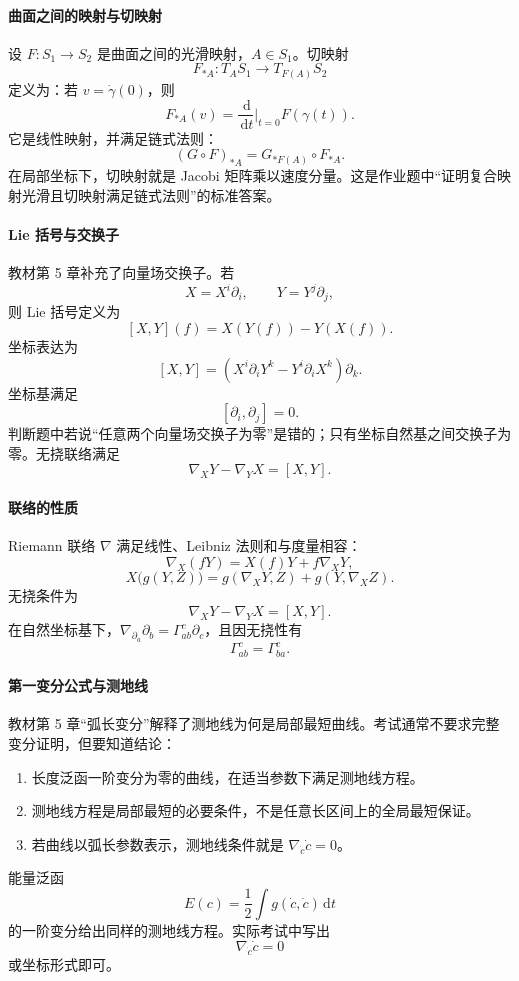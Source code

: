 \documentclass[UTF8,12pt,a4paper]{ctexart}
\newcommand{\dd}{\,\mathrm d}
\begin{document}
\paragraph{曲面之间的映射与切映射}
设 $F:S_1\to S_2$ 是曲面之间的光滑映射，$A\in S_1$。切映射
\[
F_{*A}:T_AS_1\to T_{F(A)}S_2
\]
定义为：若 $v=\dot\gamma(0)$，则
\[
F_{*A}(v)=\frac{\dd}{\dd t}\bigg|_{t=0}F(\gamma(t)).
\]
它是线性映射，并满足链式法则：
\[
(G\circ F)_{*A}=G_{*F(A)}\circ F_{*A}.
\]
在局部坐标下，切映射就是 Jacobi 矩阵乘以速度分量。这是作业题中“证明复合映射光滑且切映射满足链式法则”的标准答案。

\paragraph{Lie 括号与交换子}
教材第 5 章补充了向量场交换子。若
\[
X=X^i\partial_i,\qquad Y=Y^j\partial_j,
\]
则 Lie 括号定义为
\[
[X,Y](f)=X(Y(f))-Y(X(f)).
\]
坐标表达为
\[
[X,Y]=\left(X^i\partial_iY^k-Y^i\partial_iX^k\right)\partial_k.
\]
坐标基满足
\[
[\partial_i,\partial_j]=0.
\]
判断题中若说“任意两个向量场交换子为零”是错的；只有坐标自然基之间交换子为零。无挠联络满足
\[
\nabla_XY-\nabla_YX=[X,Y].
\]

\paragraph{联络的性质}
Riemann 联络 $\nabla$ 满足线性、Leibniz 法则和与度量相容：
\[
\nabla_X(fY)=X(f)Y+f\nabla_XY,
\]
\[
X\bigl(g(Y,Z)\bigr)=g(\nabla_XY,Z)+g(Y,\nabla_XZ).
\]
无挠条件为
\[
\nabla_XY-\nabla_YX=[X,Y].
\]
在自然坐标基下，$\nabla_{\partial_a}\partial_b=\Gamma^c_{ab}\partial_c$，且因无挠性有
\[
\Gamma^c_{ab}=\Gamma^c_{ba}.
\]

\paragraph{第一变分公式与测地线}
教材第 5 章“弧长变分”解释了测地线为何是局部最短曲线。考试通常不要求完整变分证明，但要知道结论：
\begin{enumerate}
\item 长度泛函一阶变分为零的曲线，在适当参数下满足测地线方程。
\item 测地线方程是局部最短的必要条件，不是任意长区间上的全局最短保证。
\item 若曲线以弧长参数表示，测地线条件就是 $\nabla_{\dot c}\dot c=0$。
\end{enumerate}

能量泛函
\[
E(c)=\frac12\int g(\dot c,\dot c)\dd t
\]
的一阶变分给出同样的测地线方程。实际考试中写出
\[
\nabla_{\dot c}\dot c=0
\]
或坐标形式即可。
\end{document}
